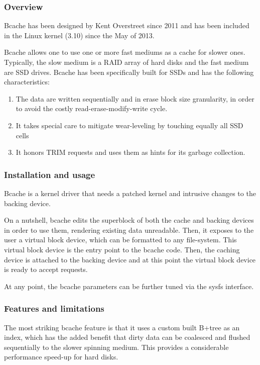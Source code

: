 \subsubsection{Overview}

Bcache has been designed by Kent Overstreet since 2011 and has been included in 
the Linux kernel (3.10) since the May of 2013.

Bcache allows one to use one or more fast mediums as a cache for slower ones.  
Typically, the slow medium is a RAID array of hard disks and the fast medium 
are SSD drives. Bcache has been specifically built for SSDs and has the 
following characteristics:

\begin{enumerate}
	\item The data are written sequentially and in erase block size 
		granularity, in order to avoid the costly 
		read-erase-modify-write cycle.
	\item It takes special care to mitigate wear-leveling by touching 
		equally all SSD cells
	\item It honors TRIM requests and uses them as hints for its garbage 
		collection.
\end{enumerate}

\subsubsection{Installation and usage}

Bcache is a kernel driver that needs a patched kernel and intrusive changes to 
the backing device.

On a nutshell, bcache edits the superblock of both the cache and backing 
devices in order to use them, rendering existing data unreadable.  Then, it 
exposes to the user a virtual block device, which can be formatted to any 
file-system. This virtual block device is the entry point to the bcache code.  
Then, the caching device is attached to the backing device and at this point 
the virtual block device is ready to accept requests.

At any point, the bcache parameters can be further tuned via the sysfs 
interface.  

\subsubsection{Features and limitations}

The most striking bcache feature is that it uses a custom built B+tree as an 
index, which has the added benefit that dirty data can be coalesced and flushed 
sequentially to the slower spinning medium. This provides a considerable 
performance speed-up for hard disks.

